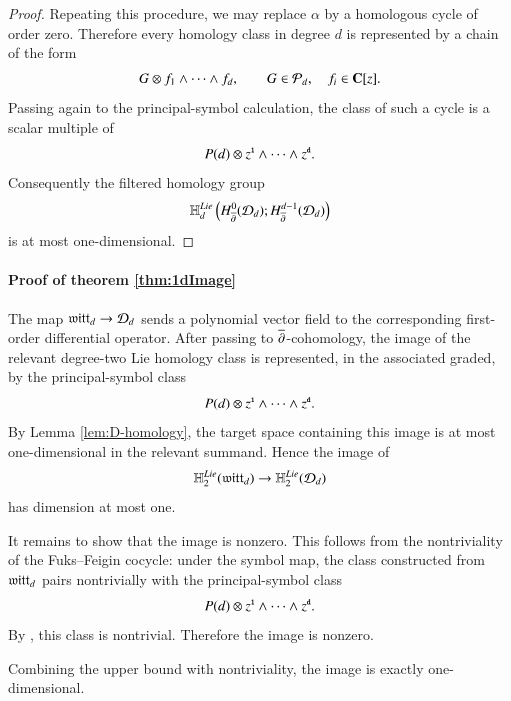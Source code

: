 \documentclass[main.tex]{subfiles}
\begin{document}
\begin{proof}
Repeating this procedure, we may replace $\alpha$ by a homologous cycle of order zero. Therefore every homology class in degree $d$ is represented by a chain of the form
\[
  G\otimes f_1\wedge\cdots\wedge f_d,
  \qquad
  G\in \mathcal P_d,\quad f_i\in \mathbf{C}[z] .
\]
Passing again to the principal-symbol calculation, the class of such a cycle is a scalar multiple of
\[
  P(d)\otimes z^{\textbf{\texttt{\tiny{1}}}}\wedge\cdots\wedge z^{\textbf{\texttt{\tiny{d}}}} .
\]
Consequently the filtered homology group
\[
  \mathbb H^{Lie}_d
  \left(
    H^0_{\overline{\partial}}(\mathcal D_d);
    H^{d-1}_{\overline{\partial}}(\mathcal D_d)
  \right)
\]
is at most one-dimensional.
\end{proof}

\paragraph{Proof of theorem \ref{thm:1dImage}}
The map $\mathfrak{witt}_d\to \mathcal D_d$
sends a polynomial vector field
to the corresponding first-order differential operator.
After passing to $\overline{\partial}$-cohomology, the image of the relevant degree-two Lie homology class is represented, in the associated graded, by the principal-symbol class
\[
  P(d)\otimes z^{\textbf{\texttt{\tiny{1}}}}\wedge\cdots\wedge z^{\textbf{\texttt{\tiny{d}}}} .
\]
By Lemma \ref{lem:D-homology}, the target space containing this image is at most one-dimensional in the relevant summand. Hence the image of
\[
  \mathbb H^{Lie}_2(\mathfrak{witt}_d)\to \mathbb H^{Lie}_2(\mathcal D_d)
\]
has dimension at most one.

It remains to show that the image is nonzero. 
This follows from the nontriviality of the Fuks--Feigin cocycle: under the symbol map, the class constructed from $\mathfrak{witt}_d$ pairs nontrivially with the principal-symbol class
\[
  P(d)\otimes z^{\textbf{\texttt{\tiny{1}}}}\wedge\cdots\wedge z^{\textbf{\texttt{\tiny{d}}}} .
\]
By \cite{FHK}, this class is nontrivial. Therefore the image is nonzero.

Combining the upper bound with nontriviality, the image is exactly one-dimensional.
\end{document}
